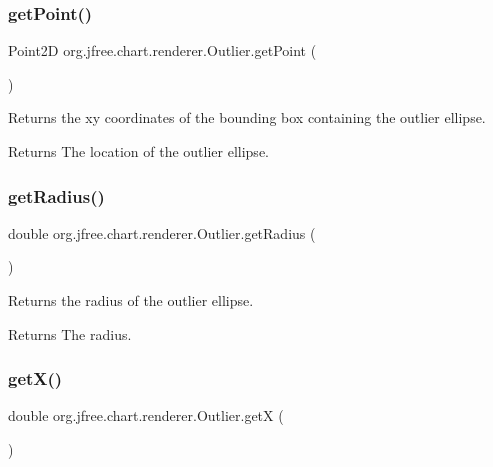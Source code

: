 \subsubsection{\texorpdfstring{get\+Point()}{getPoint()}}
{\footnotesize\ttfamily Point2D org.\+jfree.\+chart.\+renderer.\+Outlier.\+get\+Point (\begin{DoxyParamCaption}{ }\end{DoxyParamCaption})}

Returns the xy coordinates of the bounding box containing the outlier ellipse.

\begin{DoxyReturn}{Returns}
The location of the outlier ellipse. 
\end{DoxyReturn}
\mbox{\label{classorg_1_1jfree_1_1chart_1_1renderer_1_1_outlier_acfcf85a5ced55b6d111353e2e974f822}} 
\subsubsection{\texorpdfstring{get\+Radius()}{getRadius()}}
{\footnotesize\ttfamily double org.\+jfree.\+chart.\+renderer.\+Outlier.\+get\+Radius (\begin{DoxyParamCaption}{ }\end{DoxyParamCaption})}

Returns the radius of the outlier ellipse.

\begin{DoxyReturn}{Returns}
The radius. 
\end{DoxyReturn}
\mbox{\label{classorg_1_1jfree_1_1chart_1_1renderer_1_1_outlier_af196d7c02c6099338cb7698037cd4ca5}} 
\subsubsection{\texorpdfstring{get\+X()}{getX()}}
{\footnotesize\ttfamily double org.\+jfree.\+chart.\+renderer.\+Outlier.\+getX (\begin{DoxyParamCaption}{ }\end{DoxyParamCaption})}

